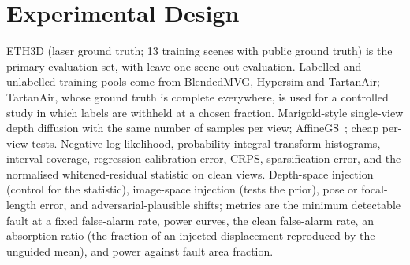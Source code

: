 \section{Experimental Design}
\label{sec:setup}
 ETH3D (laser ground truth; 13 training scenes with public ground truth) is the primary evaluation set, with leave-one-scene-out evaluation. Labelled and unlabelled training pools come from BlendedMVG, Hypersim and TartanAir; TartanAir, whose ground truth is complete everywhere, is used for a controlled study in which labels are withheld at a chosen fraction. 
 Marigold-style single-view depth diffusion with the same number of samples per view; AffineGS~\cite{tse2026affinegs}; cheap per-view tests.
 Negative log-likelihood, probability-integral-transform histograms, interval coverage, regression calibration error, CRPS,
sparsification error, and the normalised whitened-residual statistic on clean views. 
 Depth-space injection (control for the statistic), image-space injection (tests the prior), pose or focal-length error, and
adversarial-plausible shifts; metrics are the minimum detectable fault at a fixed false-alarm rate, power curves, the clean false-alarm rate, an
absorption ratio (the fraction of an injected displacement reproduced by the unguided mean), and power against fault area fraction.
 

